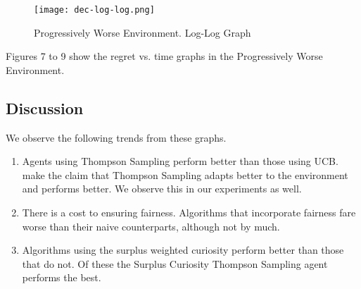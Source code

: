 \begin{figure}[ht]
    \centering
    \texttt{[image: dec-log-log.png]}
    \caption{Progressively Worse Environment. Log-Log Graph}
    \label{fig:d3}
\end{figure}

Figures 7 to 9 show the regret vs. time graphs in the Progressively Worse Environment.

\subsection{Discussion}
We observe the following trends from these graphs.

\begin{enumerate}
    \item Agents using Thompson Sampling perform better than those using UCB.  make the claim that Thompson Sampling adapts better to the environment and performs better. We observe this in our experiments as well.
    \item There is a cost to ensuring fairness. Algorithms that incorporate fairness fare worse than their naive counterparts, although not by much. 
    \item Algorithms using the surplus weighted curiosity perform better than those that do not. Of these the Surplus Curiosity Thompson Sampling agent performs the best.
\end{enumerate}


